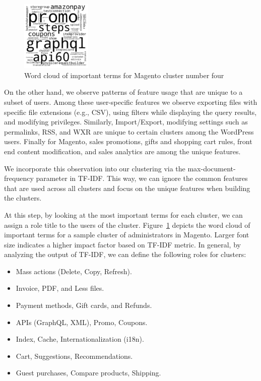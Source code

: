 \begin{figure}[t]
    \centering
    \includegraphics[width=0.3\textwidth]{figures/dbltr/magento_wordcloud.pdf}
    \caption{Word cloud of important terms for Magento cluster number four}
    \label{fig:magento_wordcloud}
\end{figure}

On the other hand, we observe patterns of feature usage that are unique to a subset of users. 
Among these user-specific features we observe exporting files with specific file extensions (e.g., CSV), using filters while displaying the query results, and modifying privileges. 
Similarly, Import/Export, modifying settings such as permalinks, RSS, and WXR are unique to certain clusters among the WordPress users. 
Finally for Magento, sales promotions, gifts and shopping cart rules, front end content modification, and sales analytics are among the unique features. 

We incorporate this observation into our clustering via the max-document-frequency parameter in TF-IDF. 
This way, we can ignore the common features that are used across all clusters and focus on the unique features when building the clusters. 

At this step, by looking at the most important terms for each cluster, we can assign a role title to the users of the cluster. 
Figure~\ref{fig:magento_wordcloud} depicts the word cloud of important terms for a sample cluster of administrators in Magento. 
Larger font size indicates a higher impact factor based on TF-IDF metric. In general, by analyzing the output of TF-IDF, we can define the following roles for clusters:

\begin{itemize}
    \item Mass actions (Delete, Copy, Refresh).
    \item Invoice, PDF, and Less files.
    \item Payment methods, Gift cards, and Refunds.
    \item APIs (GraphQL, XML), Promo, Coupons.
    \item Index, Cache, Internationalization (i18n).
    \item Cart, Suggestions, Recommendations.
    \item Guest purchases, Compare products, Shipping.
\end{itemize}

